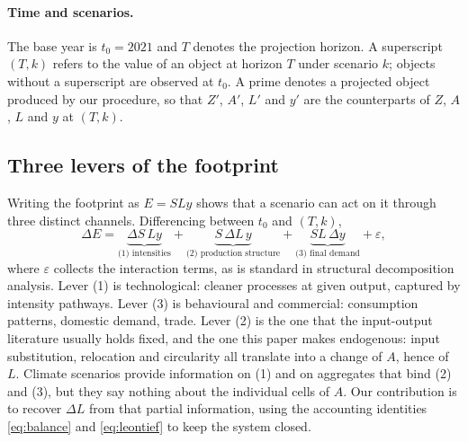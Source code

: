 \documentclass[11pt,a4paper]{article}
\begin{document}
\paragraph{Time and scenarios.}
The base year is $t_0 = 2021$ and $T$ denotes the projection horizon. A superscript
$(T,k)$ refers to the value of an object at horizon $T$ under scenario $k$; objects
without a superscript are observed at $t_0$. A prime denotes a projected object produced
by our procedure, so that $Z'$, $A'$, $L'$ and $y'$ are the counterparts of $Z$, $A$, $L$
and $y$ at $(T,k)$.

\subsection{Three levers of the footprint}
\label{sub:levers}

Writing the footprint as $E = S L y$ shows that a scenario can act on it through three
distinct channels. Differencing between $t_0$ and $(T,k)$,
\begin{equation}\label{eq:decomposition}
  \Delta E
  = \underbrace{\Delta S \, L y}_{\text{(1) intensities}}
  + \underbrace{S \, \Delta L \, y}_{\text{(2) production structure}}
  + \underbrace{S L \, \Delta y}_{\text{(3) final demand}}
  + \varepsilon ,
\end{equation}
where $\varepsilon$ collects the interaction terms, as is standard in structural decomposition analysis. Lever (1) is technological: cleaner processes at given output, captured by intensity pathways. Lever (3) is behavioural and commercial: consumption patterns, domestic demand, trade. Lever (2) is the one that the input-output literature usually holds fixed, and the one this paper makes endogenous: input substitution, relocation and circularity all
translate into a change of $A$, hence of $L$. Climate scenarios provide information on (1) and on aggregates that bind (2) and (3), but they say nothing about the individual cells of $A$. Our contribution is to recover $\Delta L$ from that partial information,
using the accounting identities \eqref{eq:balance} and \eqref{eq:leontief} to keep the
system closed.

\end{document}
